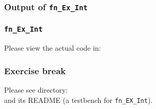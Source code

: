 
\begin{frame}[fragile]
\frametitle{Output of {\tt fn\_Ex\_Int}}

\footnotesize


\end{frame}


\begin{frame}
\frametitle{{\tt fn\_Ex\_Int}}

\footnotesize

\begin{center}\large
 Please view the actual code in: 
\end{center}

\end{frame}


\begin{frame}
\frametitle{\EmojiExercise \hmm Exercise break}

Please see directory:  \\
and its README (a testbench for {\tt fn\_EX\_Int}).

\end{frame}







